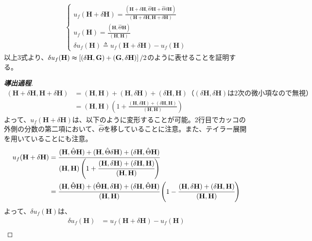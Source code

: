 \documentclass[a4paper,11pt,dvipdfmx]{jsarticle}
\begin{document}
\begin{enumerate}
\begin{align*}
\begin{cases}
        u_f (\mathbf{H} + \delta \mathbf{H}) = \frac{(\mathbf{H} + \delta \mathbf{H}, \hat{\Theta}\mathbf{H} + \hat{\Theta}\delta \mathbf{H})}{(\mathbf{H} + \delta \mathbf{H}, \mathbf{H} + \delta \mathbf{H})} \\
        \displaystyle
        u_f (\mathbf{H}) = \frac{(\mathbf{H}, \hat{\Theta}\mathbf{H})}{(\mathbf{H}, \mathbf{H})} \\
        \delta u_f (\mathbf{H}) \triangleq u_f(\mathbf{H} + \delta \mathbf{H}) - u_f(\mathbf{H})
      \end{cases}
    \end{align*}
    以上3式より、$\delta u_f (\mathbf{H}) \thickapprox \left[ (\delta \mathbf{H}, \mathbf{G}) + (\mathbf{G}, \delta\mathbf{H}) \right] / 2$のように表せることを証明する。

    \begin{proof}[\textbf{導出過程}]
      \begin{align*}
        (\mathbf{H} + \delta \mathbf{H}, \mathbf{H} + \delta \mathbf{H}) &= (\mathbf{H}, \mathbf{H}) + (\mathbf{H}, \delta \mathbf{H}) + (\delta \mathbf{H} , \mathbf{H}) （(\delta \mathbf{H}, \delta \mathbf{H})は2次の微小項なので無視） \\ 
        &= (\mathbf{H}, \mathbf{H}) \left( 1 + \frac{(\mathbf{H}, \delta \mathbf{H}) + (\delta \mathbf{H}, \mathbf{H})}{(\mathbf{H}, \mathbf{H})} \right)
      \end{align*}
      よって、$ u_f(\mathbf{H} + \delta \mathbf{H})$は、以下のように変形することが可能。2行目でカッコの外側の分数の第二項において、$\hat{\Theta}$を移していることに注意。また、テイラー展開を用いていることにも注意。
      \begin{align*}
        u_f (\mathbf{H} + \delta \mathbf{H}) &= \cfrac{(\mathbf{H}, \hat{\Theta}\mathbf{H}) + (\mathbf{H}, \hat{\Theta}\delta\mathbf{H}) + (\delta \mathbf{H}, \hat{\Theta}\mathbf{H}) }{(\mathbf{H}, \mathbf{H}) \left( 1 + \cfrac{(\mathbf{H}, \delta \mathbf{H}) + (\delta \mathbf{H}, \mathbf{H})}{(\mathbf{H}, \mathbf{H})} \right)}
        \\ 
        &= \cfrac{(\mathbf{H}, \hat{\Theta}\mathbf{H}) + (\hat{\Theta}\mathbf{H}, \delta\mathbf{H}) + (\delta \mathbf{H}, \hat{\Theta}\mathbf{H}) }{(\mathbf{H}, \mathbf{H})} \left( 1 - \cfrac{(\mathbf{H}, \delta \mathbf{H}) + (\delta \mathbf{H}, \mathbf{H})}{(\mathbf{H}, \mathbf{H})} \right)
      \end{align*}
      よって、$\delta u_f (\mathbf{H})$は、
      \begin{align*}
        \delta u_f (\mathbf{H}) &= u_f(\mathbf{H} + \delta \mathbf{H}) - u_f (\mathbf{H}) \\

\end{align*}
\end{proof}
\end{enumerate}
\end{document}
